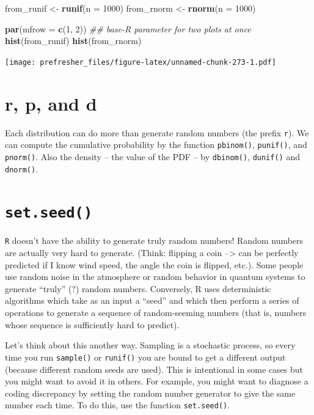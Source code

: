 \documentclass[]{book}
\newenvironment{Shaded}{\begin{snugshade}}{\end{snugshade}}
\newcommand{\CommentTok}[1]{\textcolor[rgb]{0.56,0.35,0.01}{\textit{#1}}}
\newcommand{\DataTypeTok}[1]{\textcolor[rgb]{0.13,0.29,0.53}{#1}}
\newcommand{\DecValTok}[1]{\textcolor[rgb]{0.00,0.00,0.81}{#1}}
\newcommand{\KeywordTok}[1]{\textcolor[rgb]{0.13,0.29,0.53}{\textbf{#1}}}
\newcommand{\NormalTok}[1]{#1}
\newcommand{\StringTok}[1]{\textcolor[rgb]{0.31,0.60,0.02}{#1}}
\theoremstyle{definition}
\theoremstyle{definition}
\theoremstyle{definition}
\theoremstyle{remark}
\begin{document}
\begin{Shaded}
\begin{Highlighting}[]
\NormalTok{from_runif <-}\StringTok{ }\KeywordTok{runif}\NormalTok{(}\DataTypeTok{n =} \DecValTok{1000}\NormalTok{)}
\NormalTok{from_rnorm <-}\StringTok{ }\KeywordTok{rnorm}\NormalTok{(}\DataTypeTok{n =} \DecValTok{1000}\NormalTok{)}

\KeywordTok{par}\NormalTok{(}\DataTypeTok{mfrow =} \KeywordTok{c}\NormalTok{(}\DecValTok{1}\NormalTok{, }\DecValTok{2}\NormalTok{)) }\CommentTok{## base-R parameter for two plots at once}
\KeywordTok{hist}\NormalTok{(from_runif)}
\KeywordTok{hist}\NormalTok{(from_rnorm)}
\end{Highlighting}
\end{Shaded}

\texttt{[image: prefresher\_files/figure-latex/unnamed-chunk-273-1.pdf]}

\hypertarget{r-p-and-d}{%
\section{r, p, and d}\label{r-p-and-d}}

Each distribution can do more than generate random numbers (the prefix \texttt{r}). We can compute the cumulative probability by the function \texttt{pbinom()}, \texttt{punif()}, and \texttt{pnorm()}. Also the density -- the value of the PDF -- by \texttt{dbinom()}, \texttt{dunif()} and \texttt{dnorm()}.

\hypertarget{set.seed}{%
\section{\texorpdfstring{\texttt{set.seed()}}{set.seed()}}\label{set.seed}}

\texttt{R} doesn't have the ability to generate truly random numbers! Random numbers are actually very hard to generate. (Think: flipping a coin --\textgreater{} can be perfectly predicted if I know wind speed, the angle the coin is flipped, etc.). Some people use random noise in the atmosphere or random behavior in quantum systems to generate ``truly'' (?) random numbers. Conversely, R uses deterministic algorithms which take as an input a ``seed'' and which then perform a series of operations to generate a sequence of random-seeming numbers (that is, numbers whose sequence is sufficiently hard to predict).

Let's think about this another way. Sampling is a stochastic process, so every time you run \texttt{sample()} or \texttt{runif()} you are bound to get a different output (because different random seeds are used). This is intentional in some cases but you might want to avoid it in others. For example, you might want to diagnose a coding discrepancy by setting the random number generator to give the same number each time. To do this, use the function \texttt{set.seed()}.
\end{document}
